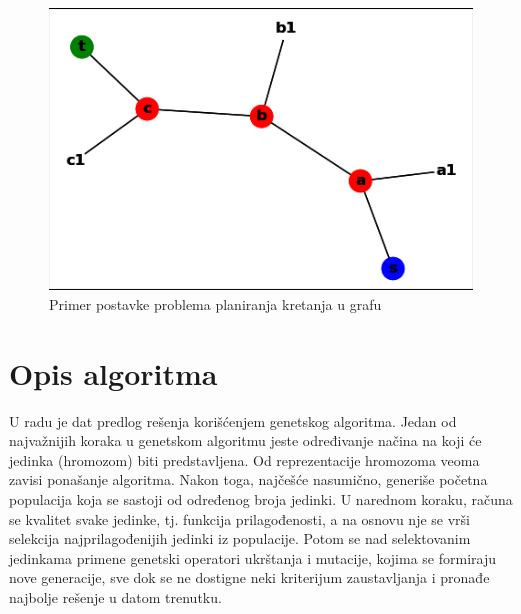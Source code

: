 \documentclass[12pt]{article}
\begin{document}
	\begin{figure}[h!]
		\begin{center}
			\includegraphics[scale=0.95]{graf.png}
		\end{center}
		\caption{Primer postavke problema planiranja kretanja u grafu}
		\label{fig:slika1}
	\end{figure}
	
	\vspace*{2\baselineskip}
	\section{Opis algoritma}
	\label{sec:prvoPoglavlje}
	\par U radu je dat predlog rešenja korišćenjem genetskog algoritma. Jedan od najvažnijih koraka u genetskom algoritmu jeste određivanje načina na koji 
	će jedinka (hromozom) biti predstavljena. Od reprezentacije hromozoma veoma zavisi ponašanje algoritma. Nakon toga, najčešće nasumično, generiše početna populacija koja se sastoji od određenog broja jedinki. U narednom koraku, računa se kvalitet svake jedinke, tj. funkcija prilagođenosti, a na osnovu nje se vrši selekcija najprilagođenijih jedinki iz populacije. Potom se nad selektovanim jedinkama primene genetski operatori ukrštanja i mutacije, kojima se formiraju nove generacije, sve dok se ne dostigne neki kriterijum zaustavljanja i pronađe najbolje rešenje u datom trenutku.
	
\end{document}

